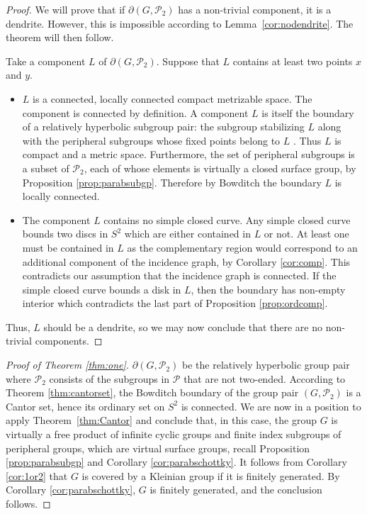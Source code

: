 \documentclass[11pt]{article}
\theoremstyle{definition}
\begin{document}
\begin{proof} 
We will prove that if  $\partial (G, \mathcal{P}_2)$ has a non-trivial component, it is a dendrite. However, this is impossible according to Lemma~\ref{cor:nodendrite}. The theorem will then follow.

Take a component $L$ of  $\partial (G, \mathcal{P}_2)$.  Suppose that $L$ contains at least two points $x$ and $y$.  


\begin{itemize} 
\item $L$ is a connected, locally connected compact metrizable space. The component is connected by definition.  
A component $L$ is itself the boundary of a relatively hyperbolic subgroup pair: the subgroup stabilizing $L$ along with the peripheral subgroups whose fixed points belong to $L$ \cite{bowrelhyp}.   Thus $L$ is compact and a metric space.  Furthermore, the set of peripheral subgroups is a subset of $\mathcal{P}_2$, each of whose elements is virtually a closed surface group, by Proposition \ref{prop:parabsubgp}.  Therefore by Bowditch \cite{bowconnect} the boundary $L$ is locally connected. 

\item The component $L$ contains no simple closed curve. Any simple closed curve  bounds two discs in $S^2$ which are either contained in $L$ or not.  At least one must be contained in $L$ as the complementary region would correspond to an additional component of the incidence graph, 
 by Corollary \ref{cor:comp}. This contradicts our assumption that the incidence graph is connected.
If the simple closed curve bounds a disk in $L$, then the boundary has non-empty interior
{which contradicts the last part of Proposition \ref{prop:ordcomp}. }
\end{itemize}

Thus, $L$ should be a dendrite, so we may now conclude that there are no non-trivial components. 
\end{proof} 

\begin{proof}[Proof of Theorem \ref{thm:one}] 
 $\partial (G, \mathcal{P}_2)$ be the relatively hyperbolic group pair where  $\mathcal{P}_2$ consists of the subgroups in $\mathcal{P}$ that are not two-ended.  According to Theorem \ref{thm:cantorset},  the Bowditch boundary of the group pair $(G, \mathcal{P}_2)$ is a Cantor set, hence its ordinary set  on $S^2$ is connected.
 We are now in a position to apply Theorem~\ref{thm:Cantor} and conclude that, in this case, the group $G$ is virtually a free product of infinite cyclic groups and finite index subgroups of peripheral groups, which are virtual surface groups, recall Proposition \ref{prop:parabsubgp} and Corollary \ref{cor:parabschottky}. It follows from Corollary \ref{cor:1or2}  that $G$ is covered by a Kleinian group if it is finitely generated. By Corollary \ref{cor:parabschottky}, $G$ is finitely generated, and the conclusion follows.
\end{proof} 
\end{document}
